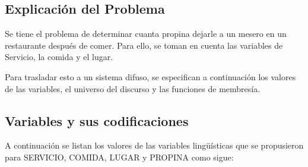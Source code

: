 \documentclass[11pt, letterpaper]{article}
\begin{document}
\subsection{Explicación del Problema}

Se tiene el problema de determinar cuanta propina dejarle a un mesero en un restaurante después de comer. Para ello, se toman en cuenta las variables de Servicio, la comida y el lugar.

Para trasladar esto a un sistema difuso, se especifican a continuación los valores de las variables, el universo del discurso y las funciones de membresía.


\subsection{Variables y sus codificaciones}

A continuación se listan los valores de las variables lingüísticas que se
propusieron para SERVICIO, COMIDA, LUGAR y PROPINA como sigue:
\end{document}
